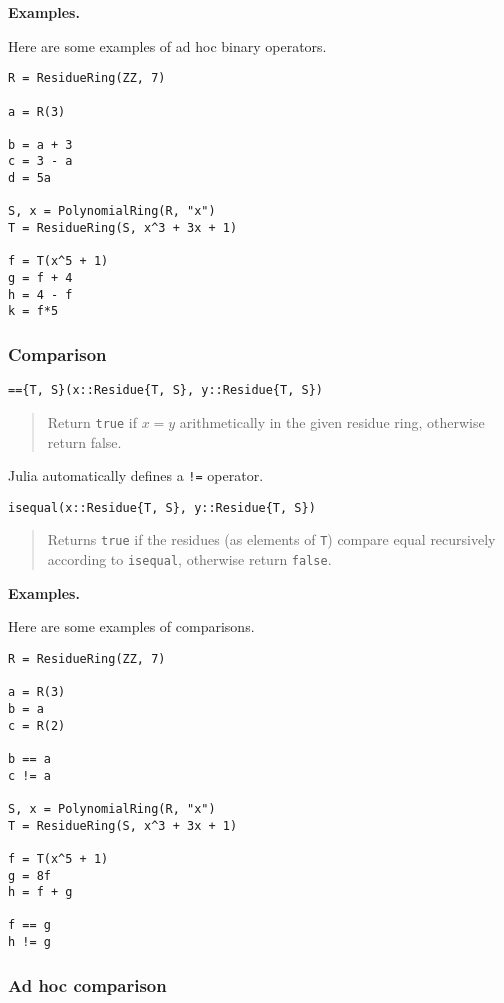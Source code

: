 \documentclass[a4paper,10pt]{article}
\newcommand{\code}{\lstinline}
\newcommand{\desc}[1]{\vspace{-3mm}\begin{quote}#1\end{quote}}
\begin{document}
{{\textbf{Examples.}

Here are some examples of ad hoc binary operators.

\begin{lstlisting}
R = ResidueRing(ZZ, 7)

a = R(3)

b = a + 3
c = 3 - a
d = 5a

S, x = PolynomialRing(R, "x")
T = ResidueRing(S, x^3 + 3x + 1)

f = T(x^5 + 1)
g = f + 4
h = 4 - f
k = f*5
\end{lstlisting}

\subsubsection{Comparison}

\begin{lstlisting}
=={T, S}(x::Residue{T, S}, y::Residue{T, S})
\end{lstlisting}

\desc{Return \code{true} if $x = y$ arithmetically in the given residue ring, 
otherwise return false.}

Julia automatically defines a \code{!=} operator.

\begin{lstlisting}
isequal(x::Residue{T, S}, y::Residue{T, S})
\end{lstlisting}

\desc{Returns \code{true} if the residues (as elements of \code{T}) compare
equal recursively according to \code{isequal}, otherwise return \code{false}.}

\textbf{Examples.}

Here are some examples of comparisons.

\begin{lstlisting}
R = ResidueRing(ZZ, 7)

a = R(3)
b = a
c = R(2)

b == a
c != a

S, x = PolynomialRing(R, "x")
T = ResidueRing(S, x^3 + 3x + 1)

f = T(x^5 + 1)
g = 8f
h = f + g

f == g
h != g
\end{lstlisting}

\subsubsection{Ad hoc comparison}

}}
\end{document}
